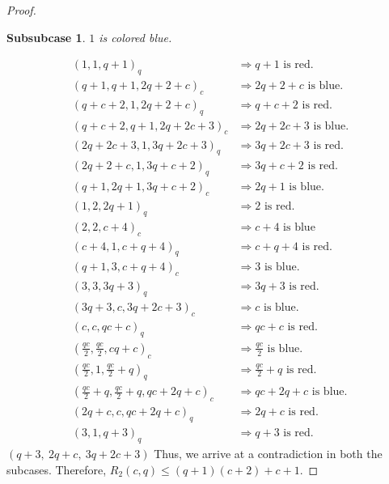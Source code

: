 \documentclass[10pt,a4paper]{amsart}
\newtheorem{subsubcase}{Subsubcase}
\begin{document}
\begin{proof}
\begin{subsubcase}
    $1$ is colored blue.
\end{subsubcase}
\begingroup
\setlength{\jot}{2pt}
\begin{align*}
(1,1,q+1)_q&\Longrightarrow q+1 \text{ is red.}\\
(q+1,q+1,2q+2+c)_c&\Longrightarrow 2q+2+c \text{ is blue.}\\
(q+c+2,1,2q+2+c)_q&\Longrightarrow q+c+2 \text{ is red.}\\
(q+c+2,q+1,2q+2c+3)_c&\Longrightarrow 2q+2c+3 \text{ is blue.}\\
(2q+2c+3,1,3q+2c+3)_q&\Longrightarrow 3q+2c+3 \text{ is red.}\\
(2q+2+c,1,3q+c+2)_q&\Longrightarrow 3q+c+2 \text{ is red.}\\
(q+1,2q+1,3q+c+2)_c&\Longrightarrow 2q+1 \text{ is blue.}\\
(1,2,2q+1)_q&\Longrightarrow 2 \text{ is red.}\\
(2,2,c+4)_c&\Longrightarrow c+4 \text{ is blue}\\
(c+4,1,c+q+4)_q&\Longrightarrow c+q+4 \text{ is red.}\\
(q+1,3,c+q+4)_c&\Longrightarrow 3 \text{ is blue.}\\
(3,3,3q+3)_q&\Longrightarrow 3q+3 \text{ is red.}\\
(3q+3,c,3q+2c+3)_c&\Longrightarrow c \text{ is blue.}\\
(c,c,qc+c)_q&\Longrightarrow qc+c \text{ is red.}\\
(\tfrac{qc}{2},\tfrac{qc}{2},cq+c)_c&\Longrightarrow \tfrac{qc}{2} \text{ is blue.}\\
(\tfrac{qc}{2},1,\tfrac{qc}{2}+q)_q&\Longrightarrow \tfrac{qc}{2}+q \text{ is red.}\\
(\tfrac{qc}{2}+q,\tfrac{qc}{2}+q,qc+2q+c)_c&\Longrightarrow qc+2q+c \text{ is blue.}\\
(2q+c,c,qc+2q+c)_q&\Longrightarrow 2q+c \text{ is red.}\\
(3,1,q+3)_q&\Longrightarrow q+3 \text{ is red.}
\end{align*}
$(q+3,\ 2q+c,\ 3q+2c+3)$
\endgroup
Thus, we arrive at a contradiction in both the subcases. Therefore, $R_2(c,q) \leq (q+1)(c+2)+c+1$. \end{proof}
\end{document}
